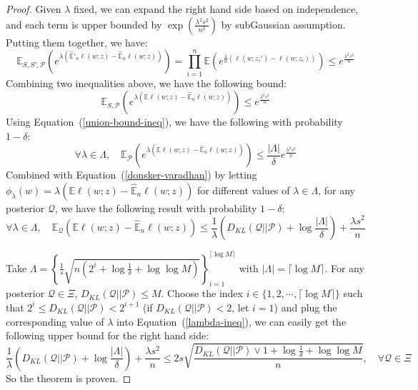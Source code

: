 \documentclass[final,12pt]{colt2018} %
\begin{document}
\begin{proof}
Given $\lambda$ fixed, we can expand the right hand side based on independence, and each term is upper bounded by $\exp\left(\frac{\lambda^2s^2}{n^2}\right)$ by subGaussian assumption. Putting them together, we have:
\begin{equation}
\mathbb{E}_{S,S',\mathcal{P}}\left(e^{\lambda\left(\hat{\mathbb{E}}'_n \ell(w;z)-\hat{\mathbb{E}}_n\ell(w;z)\right)}\right)=\prod_{i=1}^n \mathbb{E}\left(e^{\frac{\lambda}{n}\left( \ell(w;z_i')-\ell(w;z_i)\right)}\right)\leq e^{\frac{\lambda^2s^2}{n}}
\end{equation}
Combining two inequalities above, we have the following bound:
\begin{equation}
	\mathbb{E}_{S,\mathcal{P}}\left(e^{\lambda\left(\mathbb{E}\ell(w;z)-\hat{\mathbb{E}}_n \ell(w;z)\right)}\right)\leq e^{\frac{\lambda^2s^2}{n}}
\end{equation}
Using Equation~(\ref{union-bound-ineq}), we have the following with probability $1-\delta$:
\begin{equation}
	\forall \lambda\in\Lambda,\quad\mathbb{E}_{\mathcal{P}}\left(e^{\lambda\left(\mathbb{E}\ell(w;z)-\hat{\mathbb{E}}_n \ell(w;z)\right)}\right)\leq \frac{|\Lambda|}{\delta}e^{\frac{\lambda^2s^2}{n}}
\end{equation}
Combined with Equation~(\ref{donsker-varadhan}) by letting $\phi_{\lambda}(w)=\lambda\left(\mathbb{E}\ell(w;z)-\hat{\mathbb{E}}_n \ell(w;z)\right)$ for different values of $\lambda\in\Lambda$, for any posterior $\mathcal{Q}$, we have the following result with probability $1-\delta$:
\begin{equation}\label{lambda-ineq}
	\forall\lambda\in\Lambda,\quad \mathbb{E}_{\mathcal{Q}}\left(\mathbb{E} \ell(w;z)- \hat{\mathbb{E}}_n \ell(w;z)\right)\leq \frac{1}{\lambda}\left(D_{KL}(\mathcal{Q}||\mathcal{P})+\log \frac{|\Lambda|}{\delta}\right)+\frac{\lambda s^2}{n}
\end{equation}

Take $\Lambda=\left\{\frac{1}{s}\sqrt{n\left(2^i+\log\frac{1}{\delta}+\log \log M\right)}\right\}_{i=1}^{\lceil\log M\rceil}$ with $|\Lambda|=\lceil\log M\rceil$. For any posterior $\mathcal{Q}\in \Xi$, $D_{KL}(\mathcal{Q}||\mathcal{P})\leq M$. Choose the index $i\in\{1,2,\cdots, \lceil\log M\rceil\}$ such that $2^i\leq D_{KL}(\mathcal{Q}||\mathcal{P})<2^{i+1}$ (if $D_{KL}(\mathcal{Q}||\mathcal{P})<2$, let $i=1$) and plug the corresponding value of $\lambda$ into Equation~(\ref{lambda-ineq}), we can easily get the following upper bound for the right hand side:
\begin{equation}
	 \frac{1}{\lambda}\left(D_{KL}(\mathcal{Q}||\mathcal{P})+\log \frac{|\Lambda|}{\delta}\right)+\frac{\lambda s^2}{n}\leq 2s\sqrt{\frac{D_{KL}(\mathcal{Q}||\mathcal{P})\vee 1+\log \frac{1}{\delta}+\log\log M}{n}},\quad \forall \mathcal{Q}\in \Xi
\end{equation}
So the theorem is proven.
\end{proof}
\end{document}

